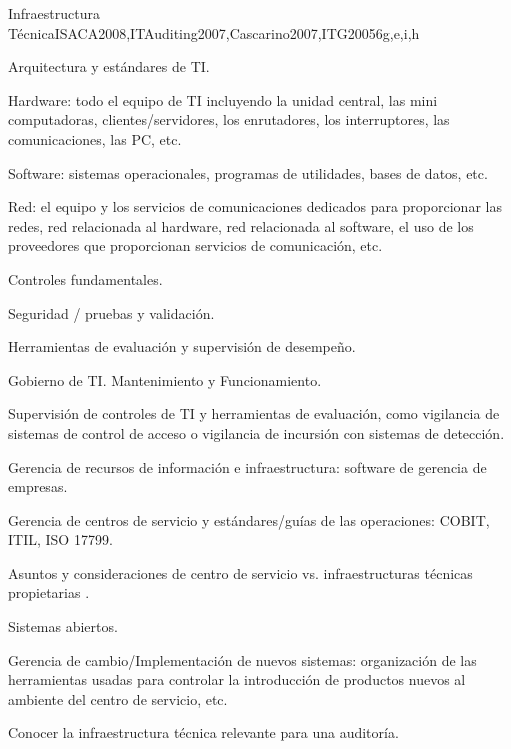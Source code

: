 \begin{syllabus}
	\begin{unit}{Infraestructura Técnica}{}{ISACA2008,ITAuditing2007,Cascarino2007,ITG2005}{6}{g,e,i,h}
	\begin{topics}
	\item Arquitectura y estándares de TI.
	\item Hardware: todo el equipo de TI incluyendo la unidad central, las mini computadoras, clientes/servidores, los enrutadores, los interruptores, las comunicaciones, las PC, etc.
	\item Software: sistemas operacionales, programas de utilidades, bases de datos, etc.
	\item Red: el equipo y los servicios de comunicaciones dedicados para proporcionar las redes, red relacionada al hardware, red relacionada al software, el uso de los proveedores que proporcionan servicios de comunicación, etc.
	\item Controles fundamentales.
	\item Seguridad / pruebas y validación.
	\item Herramientas de evaluación y supervisión de desempeño.
	\item Gobierno de TI. Mantenimiento y Funcionamiento.
	\item Supervisión de controles de TI y herramientas de evaluación, como vigilancia de sistemas de control de acceso o vigilancia de incursión con sistemas de detección.
	\item Gerencia de recursos de información e infraestructura: software de gerencia de empresas.
	\item Gerencia de centros de servicio y estándares/guías de las operaciones: COBIT, ITIL, ISO 17799.
	\item Asuntos y consideraciones de centro de servicio vs. infraestructuras técnicas propietarias .
	\item Sistemas abiertos.
	\item Gerencia de cambio/Implementación de nuevos sistemas: organización de las herramientas usadas para controlar la introducción de productos nuevos al ambiente del centro de servicio, etc.
	\end{topics}
	
	\begin{learningoutcomes}
	\item Conocer la infraestructura técnica relevante para una auditoría.
	\end{learningoutcomes}
	\end{unit}
	

\end{syllabus}
